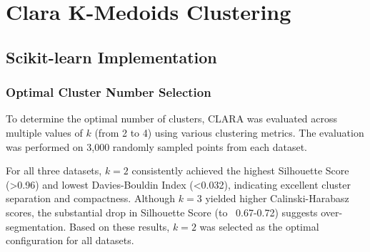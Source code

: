 \section{Clara K-Medoids Clustering}

\subsection{Scikit-learn Implementation}

\subsubsection{Optimal Cluster Number Selection}

To determine the optimal number of clusters, CLARA was evaluated across multiple values of $k$ (from 2 to 4) using various clustering metrics. The evaluation was performed on 3,000 randomly sampled points from each dataset.

\begin{table}[H]
\centering
\caption{Clustering Metrics for Different Values of $k$ Across Datasets}
\label{tab:clara_optimal_k}
\end{table}

For all three datasets, $k=2$ consistently achieved the highest Silhouette Score (>0.96) and lowest Davies-Bouldin Index (<0.032), indicating excellent cluster separation and compactness. Although $k=3$ yielded higher Calinski-Harabasz scores, the substantial drop in Silhouette Score (to ~0.67-0.72) suggests over-segmentation. Based on these results, $k=2$ was selected as the optimal configuration for all datasets.


